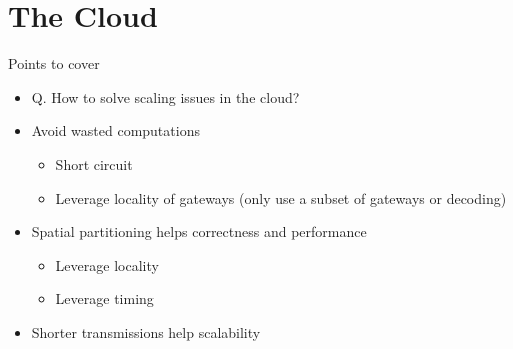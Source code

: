 \section{The Cloud}
\label{sec:cloud}

{\color{blue}
Points to cover
\begin{itemize} 
    \item Q. How to solve scaling issues in the cloud?
    \item Avoid wasted computations
        \begin{itemize}
            \item Short circuit
            \item Leverage locality of gateways (only use a subset of gateways  or decoding)
        \end{itemize}
    \item Spatial partitioning helps correctness and performance
        \begin{itemize}
            \item Leverage locality
            \item Leverage timing
        \end{itemize}
    \item Shorter transmissions help scalability
\end{itemize}
}